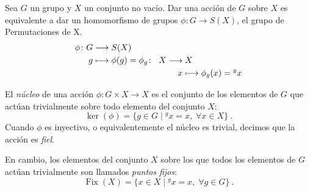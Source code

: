   
\begin{remark} \label{action}
Sea $G$ un grupo y $X$ un conjunto no vacío. Dar una acción de $G$ sobre $X$ es equivalente a dar un homomorfismo de grupos $\phi \colon G \rightarrow S(X)$, el grupo de Permutaciones de X.
    \begin{align*}
        \phi \colon G &\longrightarrow S(X) \\
        g  &\longmapsto \phi(g) = \phi_g   \colon \; \; X\longrightarrow X \\
            & \hspace{3.5cm}   x \longmapsto \phi_g(x) = {}^gx
    \end{align*}
    
\end{remark}













\begin{definition}
    El \textit{núcleo} de una acción $\phi \colon G \times X \rightarrow X$ es el conjunto de los elementos de $G$ que actúan trivialmente sobre todo elemento del conjunto $X$:
    \[
        \operatorname{ker}(\phi)=\{ g \in G \; | \; {}^gx=x, \;\forall x \in X \} \: .
    \]
    Cuando $\phi$ es inyectivo, o equivalentemente el núcleo es trivial, decimos que la acción es \textit{fiel}. 
    
    En cambio, los elementos del conjunto $X$ sobre los que todos los elementos de $G$ actúan trivialmente son llamados \textit{puntos fijos}:
    \[
        \operatorname{Fix}(X)= \{ x \in X \; | \; {}^gx=x, \; \forall g \in G \} \: .
    \]
\end{definition}



